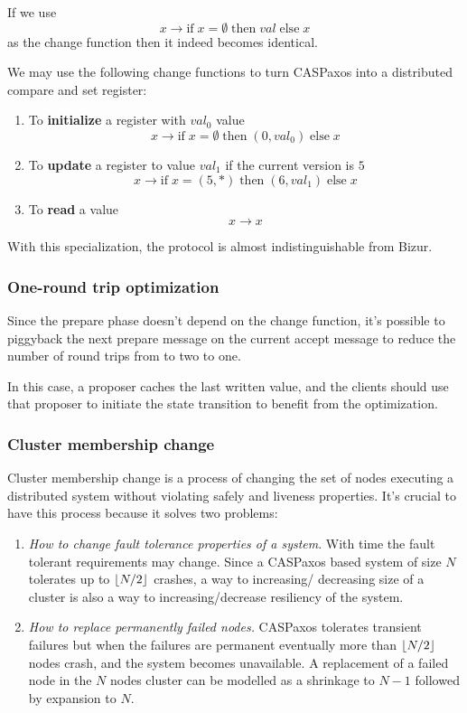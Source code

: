 \documentclass[12pt]{article}
\theoremstyle{definition}
\DeclarePairedDelimiter{\floor}{\lfloor}{\rfloor}
\begin{document}
If we use
$$x \to \mbox{if}\; x = \emptyset \;\mbox{then}\; val\; \mbox{else}\; x$$
as the change function then it indeed becomes identical.

We may use the following change functions to turn CASPaxos into a distributed compare and set register:
\begin{enumerate}
  \item To {\bf initialize} a register with $val_0$ value
  $$x \to \mbox{if}\; x = \emptyset \;\mbox{then}\; (0, val_0)\; \mbox{else}\; x$$
  
  \item To {\bf update} a register to value $val_1$ if the current version is $5$
  $$x \to \mbox{if}\; x = (5, \ast) \;\mbox{then}\; (6, val_1)\; \mbox{else}\; x$$
  
  \item To {\bf read} a value
  $$x \to x$$
\end{enumerate}

With this specialization, the protocol is almost indistinguishable from Bizur\cite{bizur}.

\subsubsection{One-round trip optimization}

Since the prepare phase doesn't depend on the change function, it's possible to piggyback the next prepare message on the current accept message to reduce the number of round trips from to two to one.

In this case, a proposer caches the last written value, and the clients should use that proposer to initiate the state transition to benefit from the optimization.

\subsubsection{Cluster membership change}

Cluster membership change is a process of changing the set of nodes executing a distributed system without violating safely and liveness properties. It's crucial to have this process because it solves two problems:

\begin{enumerate}
  \item {\it How to change fault tolerance properties of a system}. With time the fault tolerant requirements may change. Since a CASPaxos based system of size $N$ tolerates up to $\floor{N/2}$ crashes, a way to increasing/ decreasing size of a cluster is also a way to increasing/decrease resiliency of the system.

  \item {\it How to replace permanently failed nodes.} CASPaxos tolerates transient failures but when the failures are permanent eventually more than $\floor{N/2}$ nodes crash, and the system becomes unavailable. A replacement of a failed node in the $N$ nodes cluster can be modelled as a shrinkage to $N-1$ followed by expansion to $N$.
\end{enumerate}
\end{document}

